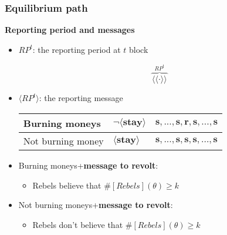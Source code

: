 \documentclass[10pt]{beamer}
\begin{document}
\begin{frame}
\frametitle{Equilibrium path}

\textbf{Reporting period and messages}

\begin{itemize}
\item $RP^t$: the reporting period at $t$ block

\[\overbrace{\langle \langle \cdot \rangle \rangle}^{RP^t}\] 

\item $\langle RP^t \rangle$: the reporting message
\begin{table}[h]
\begin{tabular}{l l l}
\alert{Burning moneys} & $\neg\langle \textbf{stay} \rangle$ & $\textbf{s},...,\textbf{s},{\textbf{r},\textbf{s},...,\textbf{s}}$ \\
\hline
\alert{Not burning money} & $\langle \textbf{stay} \rangle$ & $\textbf{s},...,\textbf{s},\textbf{s},\textbf{s},...,\textbf{s}$  \\

\end{tabular}
\end{table}
\item \alert{Burning moneys}+\textbf{message to revolt}: 
\begin{itemize}
\item Rebels believe that $\#[Rebels](\theta)\geq k$
\end{itemize}

\item \alert{Not burning moneys}+\textbf{message to revolt}: 

\begin{itemize}
\item Rebels don't believe that $\#[Rebels](\theta)\geq k$
\end{itemize}

\end{itemize}
\end{frame}
\end{document}
